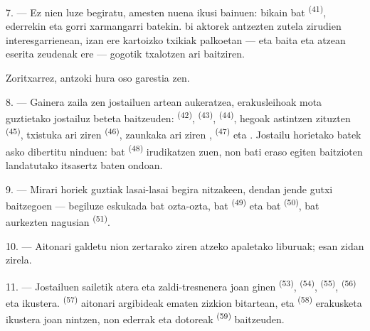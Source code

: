 7. --- Ez nien luze begiratu, amesten nuena ikusi bainuen: 
bikain bat \textsuperscript{(41)},  ederrekin eta
 gorri xarmangarri batekin.  bi aktorek
 antzezten zutela zirudien  interesgarrienean, izan
ere kartoizko  txikiak palkoetan --- eta baita  eta
  atzean eserita zeudenak ere --- gogotik
txalotzen ari baitziren.

Zoritxarrez, antzoki hura oso garestia zen.

8. --- Gainera zaila zen jostailuen artean aukeratzea, erakusleihoak mota guztietako
jostailuz beteta baitzeuden:  \textsuperscript{(42)},
 \textsuperscript{(43)}, 
\textsuperscript{(44)}, hegoak astintzen zituzten 
\textsuperscript{(45)}, txistuka ari ziren 
\textsuperscript{(46)}, zaunkaka ari ziren ,
 \textsuperscript{(47)} eta . Jostailu
horietako batek asko dibertitu ninduen:  bat
\textsuperscript{(48)} irudikatzen zuen, non  bati
 eraso egiten baitzioten  landatutako
itsasertz baten ondoan.


9. --- Mirari horiek guztiak lasai-lasai begira nitzakeen, dendan jende gutxi
baitzegoen --- begiluze eskukada bat ozta-ozta,  bat
\textsuperscript{(49)} eta  bat \textsuperscript{(50)},
 bat aurkezten  nagusian \textsuperscript{(51)}.

10. --- Aitonari galdetu nion zertarako ziren  atzeko
apaletako liburuak; esan zidan  zirela.

\VUsaut{3.6mm}
\VUsaut{2.8mm}

11. --- Jostailuen sailetik atera eta zaldi-tresnenera joan ginen
 \textsuperscript{(53)}, 
\textsuperscript{(54)},  \textsuperscript{(55)},
 \textsuperscript{(56)} eta  ikustera.
 \textsuperscript{(57)} aitonari argibideak ematen zizkion
bitartean,  eta  \textsuperscript{(58)}
erakusketa ikustera joan nintzen, non  ederrak eta
 dotoreak \textsuperscript{(59)} baitzeuden.

